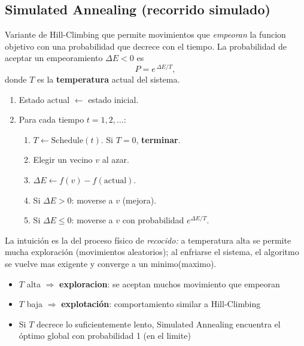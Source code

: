 \subsection{Simulated Annealing (recorrido simulado)}

\begin{definition}
    Variante de Hill-Climbing que permite movimientos que \emph{empeoran} la funcion objetivo con una probabilidad que decrece con el tiempo. La probabilidad
    de aceptar un empeoramiento $\Delta E < 0$ es 
    \[
    P = e^{\,\Delta E / T},
    \]
    donde $T$ es la \textbf{temperatura} actual del sistema.
    
\end{definition}

\begin{enumerate}
    \item Estado actual $\leftarrow$ estado inicial.
    \item Para cada tiempo $t = 1, 2, \ldots$:
      \begin{enumerate}
        \item $T \leftarrow \text{Schedule}(t)$. Si $T = 0$,
              \textbf{terminar}.
        \item Elegir un vecino $v$ al azar.
        \item $\Delta E \leftarrow f(v) - f(\text{actual})$.
        \item Si $\Delta E > 0$: moverse a $v$ (mejora).
        \item Si $\Delta E \leq 0$: moverse a $v$ con probabilidad
              $e^{\Delta E/T}$.
      \end{enumerate}
  \end{enumerate}

\noindent La intuición es la del proceso físico de \emph{recocido:} a temperatura alta se permite mucha exploración (movimientos aleatorios);
al enfriarse el sistema, el algoritmo se vuelve mas exigente y converge a un minimo(maximo).

\begin{theorem}
    \begin{itemize}
        \item $T$ alta $\Rightarrow$ \textbf{exploracion}: se aceptan muchos movimiento que empeoran
        \item $T$ baja $\Rightarrow$ \textbf{explotación}: comportamiento similar a Hill-Climbing
        \item Si $T$ decrece lo suficientemente lento, Simulated Annealing encuentra el óptimo global con probabilidad 1 (en el limite)
    \end{itemize}
    
\end{theorem}

